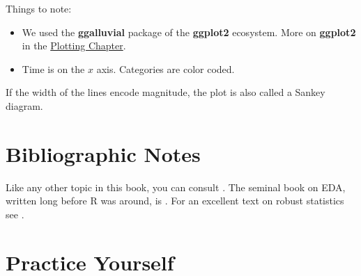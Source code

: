 \documentclass[]{book}
\providecommand{\tightlist}{%
  \setlength{\itemsep}{0pt}\setlength{\parskip}{0pt}}
\theoremstyle{definition}
\theoremstyle{definition}
\theoremstyle{definition}
\theoremstyle{remark}
\let\BeginKnitrBlock\begin \let\EndKnitrBlock\end
\begin{document}
Things to note:

\begin{itemize}
\tightlist
\item
  We used the \textbf{ggalluvial} package of the \textbf{ggplot2} ecosystem. More on \textbf{ggplot2} in the \protect\hyperlink{plotting}{Plotting Chapter}.
\item
  Time is on the \(x\) axis. Categories are color coded.
\end{itemize}

\BeginKnitrBlock{remark}
{}If the width of the lines encode magnitude, the plot is also called a Sankey diagram.
\EndKnitrBlock{remark}

\hypertarget{bibliographic-notes-3}{%
\section{Bibliographic Notes}\label{bibliographic-notes-3}}

Like any other topic in this book, you can consult \citet{venables2013modern}.
The seminal book on EDA, written long before R was around, is \citet{tukey1977exploratory}.
For an excellent text on robust statistics see \citet{wilcox2011introduction}.

\hypertarget{practice-yourself-2}{%
\section{Practice Yourself}\label{practice-yourself-2}}
\end{document}
